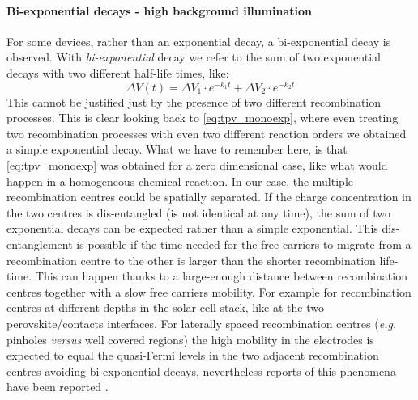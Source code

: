	\paragraph{Bi-exponential decays - high background illumination}
	For some devices, rather than an exponential decay, a bi-exponential decay is observed. With \emph{bi-exponential} decay we refer to the sum of two exponential decays with two different half-life times, like:
	$$\Delta V (t) = \Delta V_1 \cdot e^{-k_1t} + \Delta V_2 \cdot e^{-k_2t}$$
	This cannot be justified just by the presence of two different recombination processes.
	This is clear looking back to \cref{eq:tpv_monoexp}, where even treating two recombination processes with even two different reaction orders we obtained a simple exponential decay.
	What we have to remember here, is that \cref{eq:tpv_monoexp} was obtained for a zero dimensional case, like what would happen in a homogeneous chemical reaction.
	In our case, the multiple recombination centres could be spatially separated.
	If the charge concentration in the two centres is dis-entangled (is not identical at any time), the sum of two exponential decays can be expected rather than a simple exponential.
	This dis-entanglement is possible if the time needed for the free carriers to migrate from a recombination centre to the other is larger than the shorter recombination life-time.
	This can happen thanks to a large-enough distance between recombination centres together with a slow free carriers mobility.
	For example for recombination centres at different depths in the solar cell stack, like at the two perovskite/contacts interfaces.
	For laterally spaced recombination centres (\textit{e.g.} pinholes \textit{versus} well covered regions) the high mobility in the electrodes is expected to equal the quasi-Fermi levels in the two adjacent recombination centres avoiding bi-exponential decays, nevertheless reports of this phenomena have been reported \cite{Montcada2017}.
	
